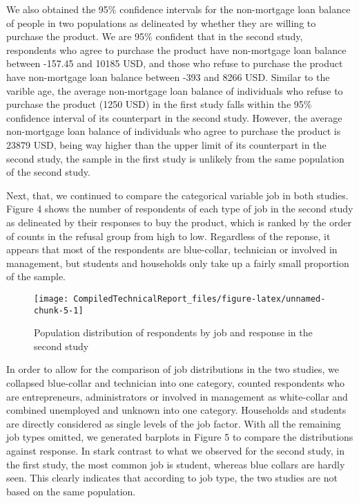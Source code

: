 \documentclass[]{article}
\begin{document}
We also obtained the 95\% confidence intervals for the non-mortgage loan
balance of people in two populations as delineated by whether they are
willing to purchase the product. We are 95\% confident that in the
second study, respondents who agree to purchase the product have
non-mortgage loan balance between -157.45 and 10185 USD, and those who
refuse to purchase the product have non-mortgage loan balance between
-393 and 8266 USD. Similar to the varible age, the average non-mortgage
loan balance of individuals who refuse to purchase the product (1250
USD) in the first study falls within the 95\% confidence interval of its
counterpart in the second study. However, the average non-mortgage loan
balance of individuals who agree to purchase the product is 23879 USD,
being way higher than the upper limit of its counterpart in the second
study, the sample in the first study is unlikely from the same
population of the second study.

Next, that, we continued to compare the categorical variable job in both
studies. Figure 4 shows the number of respondents of each type of job in
the second study as delineated by their responses to buy the product,
which is ranked by the order of counts in the refusal group from high to
low. Regardless of the reponse, it appears that most of the respondents
are blue-collar, technician or involved in management, but students and
households only take up a fairly small proportion of the sample.

\begin{figure}

{\centering \texttt{[image: CompiledTechnicalReport\_files/figure-latex/unnamed-chunk-5-1]} 

}

\caption{Population distribution of respondents by job and response in the second study}\label{fig:unnamed-chunk-5}
\end{figure}

\newpage

In order to allow for the comparison of job distributions in the two
studies, we collapsed blue-collar and technician into one category,
counted respondents who are entrepreneurs, administrators or involved in
management as white-collar and combined unemployed and unknown into one
category. Households and students are directly considered as single
levels of the job factor. With all the remaining job types omitted, we
generated barplots in Figure 5 to compare the distributions against
response. In stark contrast to what we observed for the second study, in
the first study, the most common job is student, whereas blue collars
are hardly seen. This clearly indicates that according to job type, the
two studies are not based on the same population.
\end{document}

